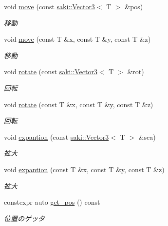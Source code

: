 \begin{DoxyCompactItemize}
\item 
void \mbox{\hyperlink{classsaki_1_1_transform_a997aaa3a40a960383e690b6c70665331}{move}} (const \mbox{\hyperlink{classsaki_1_1_vector3}{saki\+::\+Vector3}}$<$ T $>$ \&pos)
\begin{DoxyCompactList}\small\item\em 移動 \end{DoxyCompactList}\item 
void \mbox{\hyperlink{classsaki_1_1_transform_ad82b8e7ab975ebbce54f7d0db2489ac7}{move}} (const T \&x, const T \&y, const T \&z)
\begin{DoxyCompactList}\small\item\em 移動 \end{DoxyCompactList}\item 
void \mbox{\hyperlink{classsaki_1_1_transform_adf6071b145056f24ca2a456bb4331999}{rotate}} (const \mbox{\hyperlink{classsaki_1_1_vector3}{saki\+::\+Vector3}}$<$ T $>$ \&rot)
\begin{DoxyCompactList}\small\item\em 回転 \end{DoxyCompactList}\item 
void \mbox{\hyperlink{classsaki_1_1_transform_a32092ef9a74c34b01b68068f7a6319e1}{rotate}} (const T \&x, const T \&y, const T \&z)
\begin{DoxyCompactList}\small\item\em 回転 \end{DoxyCompactList}\item 
void \mbox{\hyperlink{classsaki_1_1_transform_ae5fccba53037829b434269fe2c60b13d}{expantion}} (const \mbox{\hyperlink{classsaki_1_1_vector3}{saki\+::\+Vector3}}$<$ T $>$ \&sca)
\begin{DoxyCompactList}\small\item\em 拡大 \end{DoxyCompactList}\item 
void \mbox{\hyperlink{classsaki_1_1_transform_adbb630c8fbb0cc2c03c60ee8f9433a49}{expantion}} (const T \&x, const T \&y, const T \&z)
\begin{DoxyCompactList}\small\item\em 拡大 \end{DoxyCompactList}\item 
constexpr auto \mbox{\hyperlink{classsaki_1_1_transform_a75bbd7f2033595079c51d629f06e5624}{get\+\_\+pos}} () const
\begin{DoxyCompactList}\small\item\em 位置のゲッタ \end{DoxyCompactList}\item 

\end{DoxyCompactItemize}
